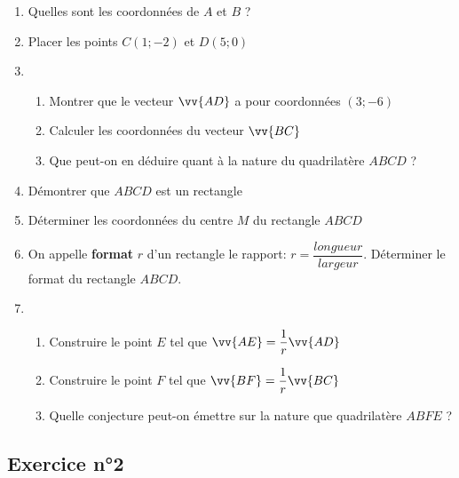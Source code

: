 \documentclass[12pt,a4paper]{article}
\begin{document}
\begin{enumerate}
    \item Quelles sont les coordonnées de $A$ et $B$ ?
    \item Placer les points $C(1;-2)$ et $D(5;0)$
    \item 
    \begin{enumerate}
        \item Montrer que le vecteur $\vv{AD}$ a pour coordonnées $(3;-6)$
        \item Calculer les coordonnées du vecteur $\vv{BC}$
        \item Que peut-on en déduire quant à la nature du quadrilatère $ABCD$ ?
    \end{enumerate}
    \item Démontrer que $ABCD$ est un rectangle
    \item Déterminer les coordonnées du centre $M$ du rectangle $ABCD$
    \item On appelle \textbf{format} $r$ d'un rectangle le rapport: $r=\dfrac{longueur}{largeur}$. Déterminer le format du rectangle $ABCD$.
    \item 
    \begin{enumerate}
        \item Construire le point $E$ tel que $\vv{AE}=\dfrac{1}{r}\vv{AD}$
        \item Construire le point $F$ tel que $\vv{BF}=\dfrac{1}{r}\vv{BC}$
        \item Quelle conjecture peut-on émettre sur la nature que quadrilatère $ABFE$ ?
    \end{enumerate}
\end{enumerate}

\subsection*{Exercice n°2}
\end{document}
